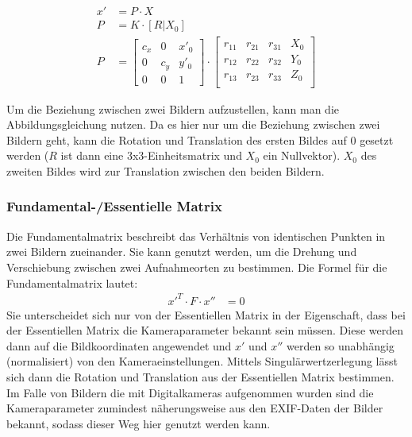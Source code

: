 \documentclass[./00_PhotoBox.tex]{subfiles}
\begin{document}
\begin{align}
    \label{abbildungsgleichung}
    x' & = P \cdot X       \\
    P  & = K \cdot [R|X_0] \\
    P  & =
    \begin{bmatrix}
        c_x & 0   & x'_0 \\
        0   & c_y & y'_0 \\
        0   & 0   & 1
    \end{bmatrix}
    \cdot
    \begin{bmatrix}
        r_11 & r_21 & r_31 & X_0 \\
        r_12 & r_22 & r_32 & Y_0 \\
        r_13 & r_23 & r_33 & Z_0 \\
    \end{bmatrix}
\end{align}

Um die Beziehung zwischen zwei Bildern aufzustellen, kann man die Abbildungsgleichung nutzen. Da es hier nur um die Beziehung zwischen zwei Bildern geht, kann die Rotation und Translation des ersten Bildes auf 0 gesetzt werden ($R$ ist dann eine 3x3-Einheitsmatrix und $X_0$ ein Nullvektor). $X_0$ des zweiten Bildes wird zur Translation zwischen den beiden Bildern. \citep[S. 326]{luhmann4}

\subsubsection{Fundamental-/Essentielle Matrix}
Die Fundamentalmatrix beschreibt das Verhältnis von identischen Punkten in zwei Bildern zueinander. Sie kann genutzt werden, um die Drehung und Verschiebung zwischen zwei Aufnahmeorten zu bestimmen. Die Formel für die Fundamentalmatrix lautet:
\begin{align}
    x'^T \cdot F \cdot x'' & = 0
\end{align}
Sie unterscheidet sich nur von der Essentiellen Matrix in der Eigenschaft, dass bei der Essentiellen Matrix die Kameraparameter bekannt sein müssen. Diese werden dann auf die Bildkoordinaten angewendet und $x'$ und $x''$ werden so unabhängig (normalisiert) von den Kameraeinstellungen. Mittels Singulärwertzerlegung lässt sich dann die Rotation und Translation aus der Essentiellen Matrix bestimmen. Im Falle von Bildern die mit Digitalkameras aufgenommen wurden sind die Kameraparameter zumindest näherungsweise aus den EXIF-Daten der Bilder bekannt, sodass dieser Weg hier genutzt werden kann. \citep[S. 257]{hartley}
\end{document}

